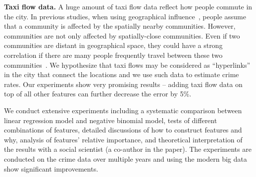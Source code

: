 \textbf{Taxi flow data.} A huge amount of taxi flow data reflect how people commute in the city. In previous studies, when using geographical influence~\cite{Ans02}, people assume that a community is affected by the spatially nearby communities. However, communities are not only affected by spatially-close communities. Even if two communities are distant in geographical space, they could have a strong correlation if there are many people frequently travel between these two communities~\cite{GGM14}. We hypothesize that taxi flows may be considered as ``hyperlinks'' in the city that connect the locations and we use such data to estimate crime rates. Our experiments show very promising results --  adding taxi flow data on top of all other features can further decrease the error by 5\%.

We conduct extensive experiments including a systematic comparison between linear regression model and negative binomial model, tests of different combinations of  features, detailed discussions of how to construct features and why, analysis of features' relative importance, and theoretical interpretation of the results with a social scientist (a co-author in the paper). The experiments are conducted on the crime data over multiple years and using the modern big data show significant improvements.
